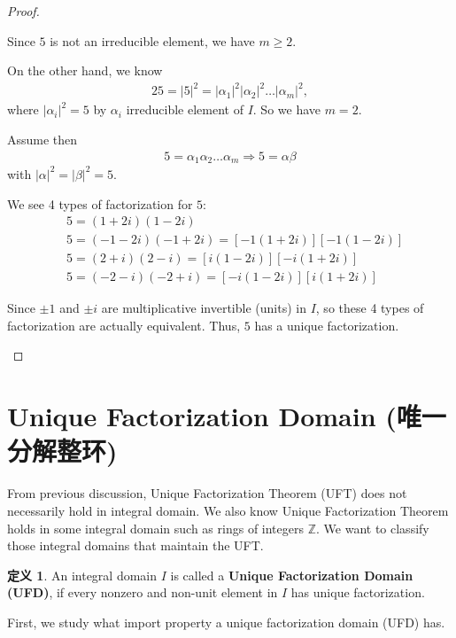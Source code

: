 \documentclass[utf8]{ctexbook}
\theoremstyle{definition}
\newtheorem{protodefinition}{定义}[section]
\newenvironment{definition}
   {\colorlet{shadecolor}{black!15}\begin{shaded}\begin{protodefinition}}
   {\end{protodefinition}\end{shaded}}
\begin{document}
\begin{proof}
\begin{enumerate}
\begin{itemize}
{Since $5$ is not an irreducible element, we have $m \geq 2$.

On the other hand, we know
\begin{align*}
25 = |5|^2 = |\alpha_1|^2 |\alpha_2|^2 \ldots |\alpha_m|^2 ,
\end{align*}
where $|\alpha_i|^2 =5$ by $\alpha_i$ irreducible element of $I$. So we have $m=2$.

Assume then
\begin{align*}
5 = \alpha_1 \alpha_2 \ldots \alpha_m \Longrightarrow 5 = \alpha \beta
\end{align*} 
with $|\alpha|^2 =  | \beta |^2 = 5$.

We see 4 types of factorization for $5$:
\begin{align*}
& 5 = (1 + 2i) (1 - 2i) \\
& 5 = (-1 - 2i) (-1 + 2i) = [ -1 (1 + 2i) ] [-1 (1 - 2i ) ] \\
& 5 = ( 2 + i ) ( 2 - i) = [ i (1- 2i) ] [ -i ( 1 + 2i) ]\\
& 5 = ( -2 - i ) (-2 + i) = [ -i ( 1 - 2i) ] [ i ( 1 + 2i ) ]
\end{align*} 

Since $\pm 1$ and $\pm i$ are multiplicative invertible (units) in $I$, so these 4 types of factorization are actually equivalent. Thus, $5$ has a unique factorization.
}
\end{itemize}

\end{enumerate}


\end{proof}

\section{Unique Factorization Domain (唯一分解整环)}

From previous discussion, Unique Factorization Theorem (UFT) does not necessarily hold in integral domain. We also know Unique Factorization Theorem holds in some integral domain such as rings of integers $\mathbb{Z}$. We want to classify those integral domains that maintain the UFT.

\begin{definition}
An integral domain $I$ is called a \textbf{Unique Factorization Domain (UFD)}, if every nonzero and non-unit element in $I$ has unique factorization.
\end{definition}

First, we study what import property a unique factorization domain (UFD) has.
\end{document}

